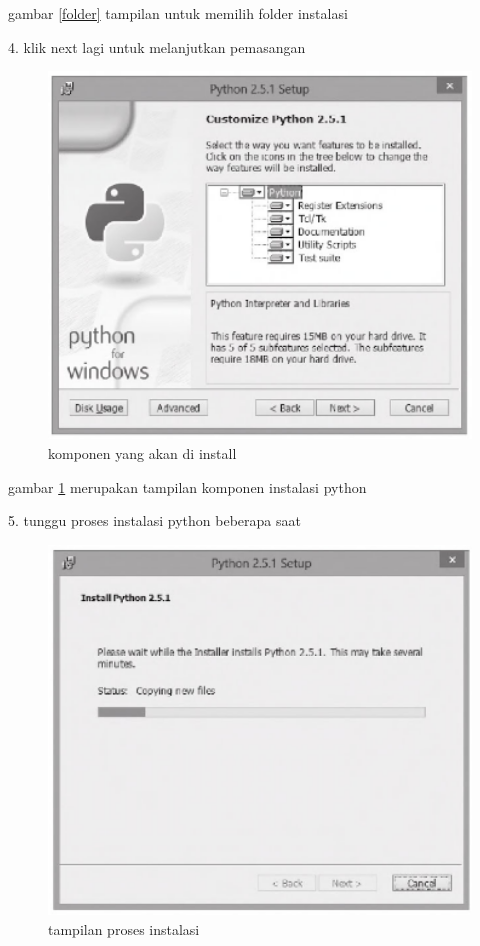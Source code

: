 \begin {enumerate}
	gambar \ref {folder} tampilan untuk memilih folder instalasi

	4. klik next lagi untuk melanjutkan pemasangan

	\begin{figure}[ht]
	\centerline{\includegraphics[width=1\textwidth]{figures/komponen.PNG}}
	\caption{komponen yang akan di install}
	\label{komponen}
	\end{figure}
	
	gambar \ref {komponen} merupakan tampilan komponen instalasi python

	5. tunggu proses instalasi python beberapa saat
	
	\begin{figure}[ht]
	\centerline{\includegraphics[width=1\textwidth]{figures/proses.PNG}}
	\caption{tampilan proses instalasi}
	\label{proses}
	\end{figure}
	

\end{enumerate}
